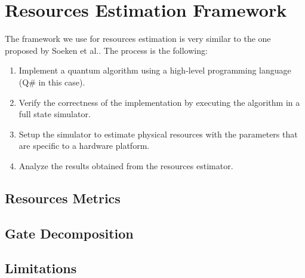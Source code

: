 %
%
\chapter {Resources Estimation Framework}

The framework we use for resources estimation is very similar to the one proposed by Soeken et al.\cite{ResourceEstimationFramework_Soeken_2021}. The process is the following:
\begin{enumerate}
    \item Implement a quantum algorithm using a high-level programming language (Q\# in this case).
    \item Verify the correctness of the implementation by executing the algorithm in a full state simulator.
    \item Setup the simulator to estimate physical resources with the parameters that are specific to a hardware platform.
    \item Analyze the results obtained from the resources estimator.
\end{enumerate}

\section{Resources Metrics}


\section{Gate Decomposition}


\section{Limitations}

